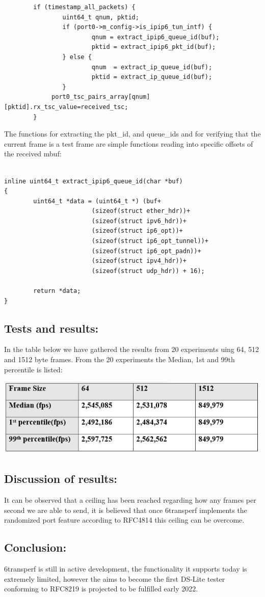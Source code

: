 \documentclass[a4paper,12p]{article}
\begin{document}
\begin{lstlisting}
        if (timestamp_all_packets) {
                uint64_t qnum, pktid;
                if (port0->m_config->is_ipip6_tun_intf) {
                        qnum = extract_ipip6_queue_id(buf);
                        pktid = extract_ipip6_pkt_id(buf);
                } else {
                        qnum  = extract_ip_queue_id(buf);
                        pktid = extract_ip_queue_id(buf);
                }
             port0_tsc_pairs_array[qnum][pktid].rx_tsc_value=received_tsc;
        }
\end{lstlisting}

The functions for extracting the pkt\_id, and queue\_ids and for verifying that the current frame is a test frame are simple functions reading into specific offsets of the received mbuf:

\begin{lstlisting}

inline uint64_t extract_ipip6_queue_id(char *buf)
{
        uint64_t *data = (uint64_t *) (buf+
                        (sizeof(struct ether_hdr))+
                        (sizeof(struct ipv6_hdr))+
                        (sizeof(struct ip6_opt))+
                        (sizeof(struct ip6_opt_tunnel))+
                        (sizeof(struct ip6_opt_padn))+
                        (sizeof(struct ipv4_hdr))+
                        (sizeof(struct udp_hdr)) + 16);

        return *data;
}

\end{lstlisting}

\subsection{Tests and results:}

In the table below we have gathered the results from 20 experiments uing 64, 512 and 1512 byte frames. From the 20 experiments the Median, 1st and 99th percentile is listed: 

\includegraphics[width=\textwidth]{results}

\subsection{Discussion of results:}
It can be observed that a ceiling has been reached regarding how any frames per second we are able to send, it is believed that once 6transperf implements the randomized port feature according to RFC4814 this ceiling can be overcome.
\subsection{Conclusion:}
6transperf is still in active development, the functionality it supports today is extremely limited, however the aims to become the first DS-Lite tester conforming to RFC8219 is projected to be fulfilled early 2022.
\end{document}
